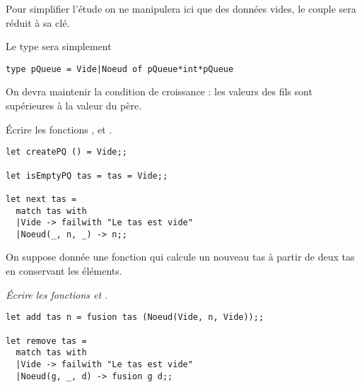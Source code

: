 \medskip


Pour simplifier l'étude on ne manipulera ici que des données vides, le couple sera réduit à sa clé.

Le type sera simplement 
\begin{lstlisting}
type pQueue = Vide|Noeud of pQueue*int*pQueue
\end{lstlisting}

On devra maintenir la condition de croissance : les valeurs des fils sont supérieures à la valeur du père.
\begin{Exercise}[title = Premières fonctions]\it 

Écrire les fonctions ,  et .
\end{Exercise}
\begin{Answer}
\begin{lstlisting}
let createPQ () = Vide;;

let isEmptyPQ tas = tas = Vide;;

let next tas =
  match tas with
  |Vide -> failwith "Le tas est vide"
  |Noeud(_, n, _) -> n;;
\end{lstlisting}
\end{Answer}

\medskip

On suppose donnée une fonction  qui calcule un nouveau tas à partir de deux tas en conservant les éléments.
\begin{Exercise}[title = Dernières fonctions]\it 
Écrire les fonctions  et .
\end{Exercise}
\begin{Answer}
\begin{lstlisting}
let add tas n = fusion tas (Noeud(Vide, n, Vide));;

let remove tas =
  match tas with
  |Vide -> failwith "Le tas est vide"
  |Noeud(g, _, d) -> fusion g d;;
\end{lstlisting}
\end{Answer}
\newpage
